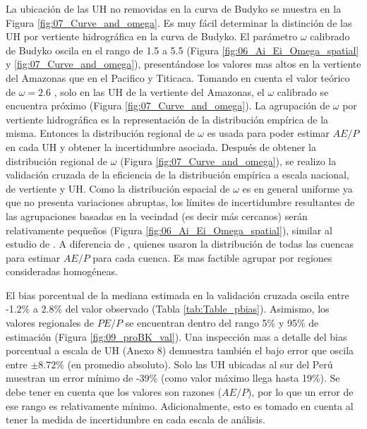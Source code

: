 \documentclass[12pt]{article}
\begin{document}

\thispagestyle{empty}

La ubicación de las UH no removidas en la curva de Budyko se muestra en la Figura \ref{fig:07_Curve_and_omega}. Es muy fácil determinar la distinción de las UH por vertiente hidrográfica en la curva de Budyko. El parámetro $\omega$ calibrado de Budyko oscila en el rango de 1.5 a 5.5 (Figura \ref{fig:06_Ai_Ei_Omega_spatial} y \ref{fig:07_Curve_and_omega}), presentándose los valores mas altos en la vertiente del Amazonas que en el Pacifico y Titicaca. Tomando en cuenta el valor teórico de $\omega = 2.6$ \citep{Fu1981}, solo en las UH de la vertiente del Amazonas, el $\omega$ calibrado se encuentra próximo (Figura \ref{fig:07_Curve_and_omega}). La agrupación de $\omega$ por vertiente hidrográfica es la representación de la distribución empírica de la misma. Entonces la distribución regional de $\omega$ es usada para poder estimar $AE/P$ en cada UH y obtener la incertidumbre asociada.
\clearpage
Después de obtener la distribución regional de $\omega$ (Figura \ref{fig:07_Curve_and_omega}), se realizo la validación cruzada de la eficiencia de la distribución empírica a escala nacional, de vertiente y UH. Como la distribución espacial de $\omega$ es en general uniforme ya que no presenta variaciones abruptas, los límites de incertidumbre resultantes de las agrupaciones basadas en la vecindad (es decir más cercanos) serán relativamente pequeños (Figura \ref{fig:06_Ai_Ei_Omega_spatial}), similar al estudio de \citet{Singh2015}. A diferencia de \citet{Greve2015}, quienes usaron la distribución de todas las cuencas para estimar $AE/P$ para cada cuenca. Es mas factible agrupar por regiones consideradas homogéneas.



\thispagestyle{empty}

El bias porcentual de la mediana estimada en la validación cruzada oscila entre -1.2\% a 2.8\% del valor observado (Tabla \ref{tab:Table_pbias}). Asimismo, los valores regionales de $PE/P$ se encuentran dentro del rango 5\% y 95\% de estimación (Figura \ref{fig:09_proBK_val}). Una inspección mas a detalle del bias porcentual a escala de UH (Anexo 8) demuestra también el bajo error que oscila entre $\pm8.72\%$ (en promedio absoluto). Solo las UH ubicadas al sur del Perú muestran un error mínimo de -39\% (como valor máximo llega hasta 19\%). Se debe tener en cuenta que los valores son razones ($AE/P$), por lo que un error de ese rango es relativamente mínimo. Adicionalmente, esto es tomado en cuenta al tener la medida de incertidumbre en cada escala de análisis.
\end{document}
